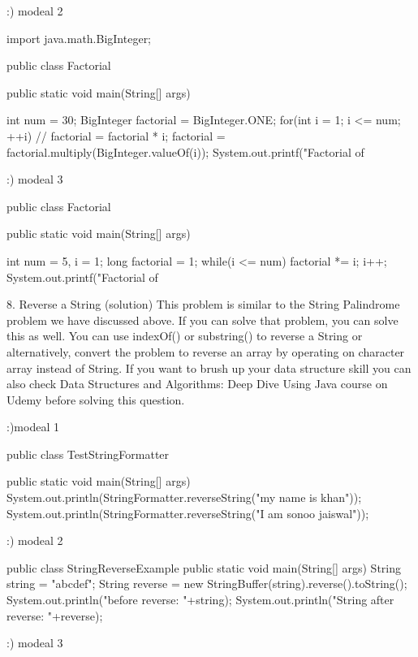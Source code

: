   
  :) modeal 2
  
  import java.math.BigInteger;

public class Factorial {

    public static void main(String[] args) {

        int num = 30;
        BigInteger factorial = BigInteger.ONE;
        for(int i = 1; i <= num; ++i)
        {
            // factorial = factorial * i;
            factorial = factorial.multiply(BigInteger.valueOf(i));
        }
        System.out.printf("Factorial of %
    }
}
  
  
  :) modeal 3
  
  
  public class Factorial {

    public static void main(String[] args) {

        int num = 5, i = 1;
        long factorial = 1;
        while(i <= num)
        {
            factorial *= i;
            i++;
        }
        System.out.printf("Factorial of %
    }
}

  

8. Reverse a String (solution)
This problem is similar to the String Palindrome problem we have discussed above. If you can solve that problem, 
you can solve this as well. You can use indexOf() or substring() to reverse a String or alternatively, convert the
 problem to reverse an array by operating on character array instead of String. If you want to brush up your data structure
 skill you can also check Data Structures and Algorithms: Deep Dive Using Java course on Udemy before solving this question.


		:)modeal 1
		
	public class TestStringFormatter {  

	public static void main(String[] args) {  
    System.out.println(StringFormatter.reverseString("my name is khan"));  
    System.out.println(StringFormatter.reverseString("I am sonoo jaiswal"));      
    }  
	}  

		:) modeal 2
		
		public class StringReverseExample{
   public static void main(String[] args) {
      String string = "abcdef";
      String reverse = new StringBuffer(string).reverse().toString();
      System.out.println("\nString before reverse: "+string);
      System.out.println("String after reverse: "+reverse);
   }
}
		
		
		:) modeal 3
		
		
		
